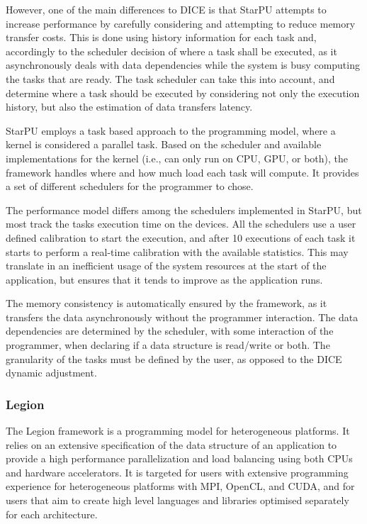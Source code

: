 However, one of the main differences to DICE is that StarPU attempts to increase performance by carefully considering and attempting to reduce memory transfer costs. This is done using history information for each task and, accordingly to the scheduler decision of where a task shall be executed, as it asynchronously deals with data dependencies while the system is busy computing the tasks that are ready. The task scheduler can take this into account, and determine where a task should be executed by considering not only the execution history, but also the estimation of data transfers latency.

StarPU employs a task based approach to the programming model, where a kernel is considered a parallel task. Based on the scheduler and available implementations for the kernel (i.e., can only run on CPU, GPU, or both), the framework handles where and how much load each task will compute. It provides a set of different schedulers for the programmer to chose.

The performance model differs among the schedulers implemented in StarPU, but most track the tasks execution time on the devices. All the schedulers use a user defined calibration to start the execution, and after 10 executions of each task it starts to perform a real-time calibration with the available statistics. This may translate in an inefficient usage of the system resources at the start of the application, but ensures that it tends to improve as the application runs.

The memory consistency is automatically ensured by the framework, as it transfers the data asynchronously without the programmer interaction. The data dependencies are determined by the scheduler, with some interaction of the programmer, when declaring if a data structure is read/write or both. The granularity of the tasks must be defined by the user, as opposed to the DICE dynamic adjustment.

\subsubsection*{Legion}

The Legion framework \cite{Legion} is a programming model for heterogeneous platforms. It relies on an extensive specification of the data structure of an application to provide a high performance parallelization and load balancing using both CPUs and hardware accelerators. It is targeted for users with extensive programming experience for heterogeneous platforms with MPI, OpenCL, and CUDA, and for users that aim to create high level languages and libraries optimised separately for each architecture.

